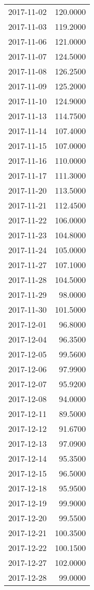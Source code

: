\begin{tabular}{lr}
2017-11-02 &    120.0000 \\
2017-11-03 &    119.2000 \\
2017-11-06 &    121.0000 \\
2017-11-07 &    124.5000 \\
2017-11-08 &    126.2500 \\
2017-11-09 &    125.2000 \\
2017-11-10 &    124.9000 \\
2017-11-13 &    114.7500 \\
2017-11-14 &    107.4000 \\
2017-11-15 &    107.0000 \\
2017-11-16 &    110.0000 \\
2017-11-17 &    111.3000 \\
2017-11-20 &    113.5000 \\
2017-11-21 &    112.4500 \\
2017-11-22 &    106.0000 \\
2017-11-23 &    104.8000 \\
2017-11-24 &    105.0000 \\
2017-11-27 &    107.1000 \\
2017-11-28 &    104.5000 \\
2017-11-29 &     98.0000 \\
2017-11-30 &    101.5000 \\
2017-12-01 &     96.8000 \\
2017-12-04 &     96.3500 \\
2017-12-05 &     99.5600 \\
2017-12-06 &     97.9900 \\
2017-12-07 &     95.9200 \\
2017-12-08 &     94.0000 \\
2017-12-11 &     89.5000 \\
2017-12-12 &     91.6700 \\
2017-12-13 &     97.0900 \\
2017-12-14 &     95.3500 \\
2017-12-15 &     96.5000 \\
2017-12-18 &     95.9500 \\
2017-12-19 &     99.9000 \\
2017-12-20 &     99.5500 \\
2017-12-21 &    100.3500 \\
2017-12-22 &    100.1500 \\
2017-12-27 &    102.0000 \\
2017-12-28 &     99.0000 \\

\end{tabular}
